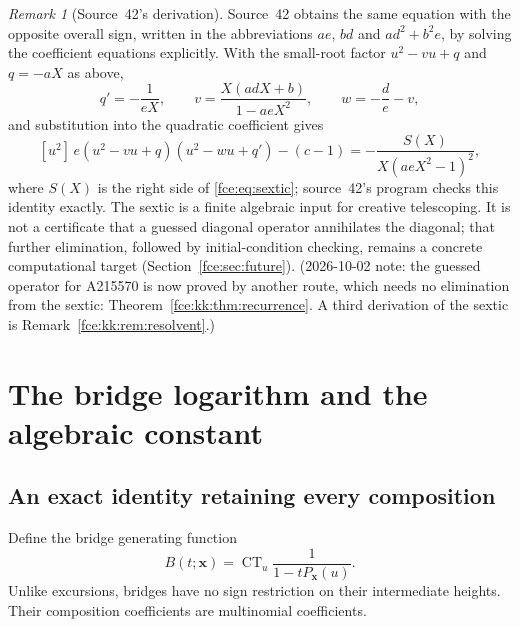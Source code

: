 \documentclass[11pt,a4paper]{article}
\numberwithin{equation}{section}
\theoremstyle{definition}\newtheorem{definition}[theorem]{Definition}
\theoremstyle{remark}\newtheorem{remark}[theorem]{Remark}
\newcommand{\ct}{\operatorname{CT}}
\begin{document}
\begin{remark}[Source~42's derivation]\label{fce:rem:sextic42}
Source~42 obtains the same equation with the opposite overall sign,
written in the abbreviations $ae$, $bd$ and $ad^2+b^2e$, by solving the
coefficient equations explicitly. With the small-root factor
$u^2-vu+q$ and $q=-aX$ as above,
\[
 q'=-\frac1{eX},\qquad v=\frac{X(adX+b)}{1-aeX^2},\qquad w=-\frac de-v,
\]
and substitution into the quadratic coefficient gives
\[
 [u^2]\,e(u^2-vu+q)(u^2-wu+q')-(c-1)=-\frac{S(X)}{X(aeX^2-1)^2},
\]
where $S(X)$ is the right side of \eqref{fce:eq:sextic}; source~42's
program checks this identity exactly. The sextic is a finite algebraic
input for creative telescoping. It is not a certificate that a guessed
diagonal operator annihilates the diagonal; that further elimination,
followed by initial-condition checking, remains a concrete computational
target (Section~\ref{fce:sec:future}). (2026-10-02 note: the guessed
operator for A215570 is now proved by another route, which needs no
elimination from the sextic: Theorem~\ref{fce:kk:thm:recurrence}. A third
derivation of the sextic is Remark~\ref{fce:kk:rem:resolvent}.)
\end{remark}

\section{The bridge logarithm and the algebraic constant}
\subsection{An exact identity retaining every composition}
Define the bridge generating function
\[
 B(t;\boldsymbol x)=\ct_u\frac{1}{1-tP_{\boldsymbol x}(u)}.
\]
Unlike excursions, bridges have no sign restriction on their intermediate
heights. Their composition coefficients are multinomial coefficients.
\end{document}
